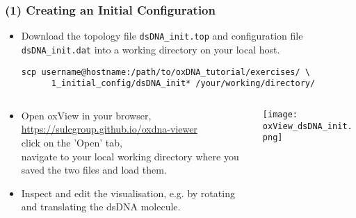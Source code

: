 \documentclass[slidestop,compress,9pt]{beamer}
\begin{document}
\begin{frame}[fragile]
\frametitle{(1) Creating an Initial Configuration}

\begin{itemize}
\item Download the topology file \texttt{dsDNA\_init.top} and configuration file \texttt{dsDNA\_init.dat} into a working directory on your local host.
\begin{lstlisting}
scp username@hostname:/path/to/oxDNA_tutorial/exercises/ \
      1_initial_config/dsDNA_init* /your/working/directory/
\end{lstlisting}
\end{itemize}

\begin{columns}

\begin{column}{0.55\textwidth}

\begin{itemize}
\setlength\itemsep{15pt}
\vspace*{-4.5cm}
\item Open oxView in your browser,\\
\href{https://sulcgroup.github.io/oxdna-viewer}{https://sulcgroup.github.io/oxdna-viewer}\\[3pt]
click on the 'Open' tab,\\[3pt]
navigate to your local working directory where you saved the two files and load them.

\item Inspect and edit the visualisation, e.g. by rotating and translating the dsDNA molecule.
\end{itemize}
\end{column}

\begin{column}{0.4\textwidth}
\texttt{[image: oxView\_dsDNA\_init.png]}
\end{column}
\end{columns}

\end{frame}
\end{document}
